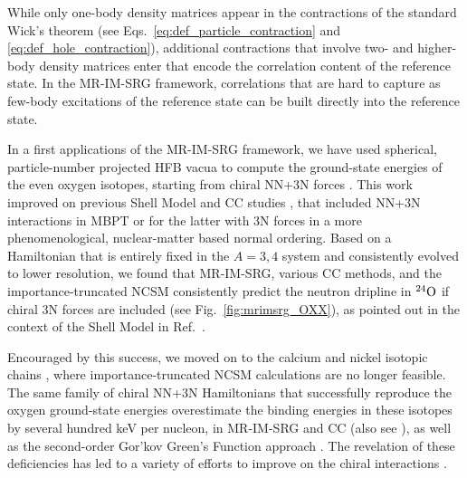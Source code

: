 While only one-body density matrices appear in the contractions of the
standard Wick's theorem (see Eqs.~\eqref{eq:def_particle_contraction}
and \eqref{eq:def_hole_contraction}), additional contractions that
involve two- and higher-body density matrices enter that encode the
correlation content of the reference state. In the MR-IM-SRG
framework, correlations that are hard to capture as few-body
excitations of the reference state can be built directly into the
reference state.


In a first applications of the MR-IM-SRG framework, we have used
spherical, particle-number projected HFB vacua to compute the
ground-state energies of the even oxygen isotopes, starting from
chiral NN+3N forces \cite{Hergert:2013ij}. This work improved on
previous Shell Model \cite{Otsuka:2010cr,Holt:2013fk} and CC studies
\cite{Hagen:2012oq}, that included NN+3N interactions in MBPT or for
the latter with 3N forces in a more phenomenological, nuclear-matter
based normal ordering.  Based on a Hamiltonian that is entirely fixed
in the $A=3,4$ system and consistently evolved to lower resolution, we
found that MR-IM-SRG, various CC methods, and the importance-truncated
NCSM consistently predict the neutron dripline in $\nuc{O}{24}$ if
chiral 3N forces are included (see Fig.~\ref{fig:mrimsrg_OXX}), as
pointed out in the context of the Shell Model in
Ref.~\cite{Otsuka:2010cr}.

Encouraged by this success, we moved on to the calcium and nickel
isotopic chains \cite{Hergert:2014vn}, where importance-truncated NCSM
calculations are no longer feasible. The same family of chiral NN+3N
Hamiltonians that successfully reproduce the oxygen ground-state
energies overestimate the binding energies in these isotopes by
several hundred keV per nucleon, in MR-IM-SRG and CC (also see
\cite{Roth:2012qf,Binder:2013zr,Binder:2014fk}), as well as the
second-order Gor'kov Green's Function approach \cite{Soma:2014eu}.
The revelation of these deficiencies has led to a variety of efforts
to improve on the chiral interactions
\cite{Ekstrom:2015fk,Hagen:2015ve,Epelbaum:2015fb,Epelbaum:2015gf,Entem:2015hl,Entem:2015qf,Carlsson:2015fk,Gezerlis:2014zr,Piarulli:2015rm,Lynn:2015eu}.


